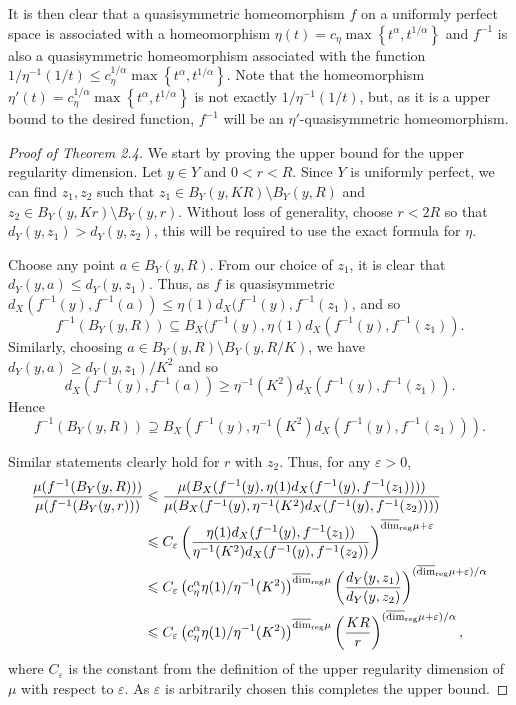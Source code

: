It is then clear that a quasisymmetric homeomorphism $f$ on a uniformly perfect space is associated with a homeomorphism $\eta(t) = c_\eta\max\left\{t^\alpha, t^{1/\alpha}\right\}$ and $f^{-1}$ is also a quasisymmetric homeomorphism associated with the function $1/\eta^{-1}(1/t) \le c_\eta^{1/\alpha} \max\left\{t^\alpha, t^{1/\alpha} \right\}$. Note that the homeomorphism $\eta'(t) = c_\eta^{1/\alpha} \max\left\{t^\alpha, t^{1/\alpha} \right\}$ is not exactly $1/\eta^{-1}(1/t)$, but, as it is a upper bound to the desired function, $f^{-1}$ will be an $\eta'$-quasisymmetric homeomorphism.


\begin{proof}[Proof of Theorem 2.4]
	We start by proving the upper bound for the upper regularity dimension. Let $y\in Y$ and $0<r<R$. Since $Y$ is uniformly perfect, we can find $z_1,z_2$ such that $z_1\in B_Y(y,KR) \setminus B_Y(y,R)$ and $z_2 \in B_Y(y,Kr) \setminus B_Y(y,r)$. Without loss of generality, choose $ r < 2R $ so that $d_Y(y,z_1) > d_Y(y,z_2)$,  this will be required to use the exact formula for $\eta$.
	
	
	Choose any point $a \in B_Y(y,R)$. From our choice of $z_1$, it is clear that $d_Y( y , a ) \le d_Y(y , z_1)$. Thus, as $f$ is quasisymmetric $d_X( f^{-1}(y) , f^{-1}(a) ) \le \eta(1)  d_X(f^{-1}(y) , f^{-1}(z_1) $, and so 
	\[
	f^{-1}(B_Y(y,R)) \subseteq B_X(f^{-1}(y),\eta(1)d_X(f^{-1}(y), f^{-1}(z_1)).
	\]
	Similarly, choosing $a \in B_Y(y,R) \setminus B_Y(y,R/K)$, we have $d_Y( y , a ) \ge d_Y( y , z_1 )/K^2$ and so $$d_X( f^{-1}(y) , f^{-1}(a) ) \ge \eta^{-1}(K^2) d_X( f^{-1}(y) , f^{-1}(z_1) ).$$
	Hence 
	\[
	f^{-1}(B_Y(y,R)) \supseteq B_X(f^{-1}(y),\eta^{-1}(K^2)d_X(f^{-1}(y),f^{-1}(z_1))).
	\]
	
	
	
	Similar statements clearly hold for $r$ with $z_2$. Thus, for any $\varepsilon > 0$,
	\begin{align*}
	\frac{\mu(f^{-1}(B_Y(y,R)))}{\mu(f^{-1}(B_Y(y,r)))} &\leqslant \frac{\mu(B_X(f^{-1}(y),\eta(1)d_X(f^{-1}(y), f^{-1}(z_1)) ))}{\mu(B_X(f^{-1}(y),\eta^{-1}(K^2)d_X(f^{-1}(y),f^{-1}(z_2)) ))} \\
	& \leqslant C_{\varepsilon}\left( \frac{\eta(1)d_X(f^{-1}(y),f^{-1}(z_1))}{\eta^{-1}(K^2)d_X(f^{-1}(y),f^{-1}(z_2))}\right)^{\overline{\dim}_{\textup{reg}} \mu + \varepsilon} \\
	& \leqslant C_{\varepsilon}\left(c_\eta^{\alpha} \eta(1)/\eta^{-1}(K^2)\right)^{\overline{\dim}_{\textup{reg}} \mu} \left(\frac{d_Y(y,z_1)}{d_Y(y,z_2)} \right)^{(\overline{\dim}_{\textup{reg}} \mu + \varepsilon)  / \alpha} \\
	& \leqslant C_{\varepsilon}\left(c_\eta^{\alpha} \eta(1)/\eta^{-1}(K^2)\right)^{\overline{\dim}_{\textup{reg}} \mu} \left(\frac{KR}{r} \right)^{(\overline{\dim}_{\textup{reg}} \mu +\varepsilon)/ \alpha},
	\end{align*}
	where $C_{\varepsilon}$ is the constant from the definition of the upper regularity dimension of $\mu$ with respect to $\varepsilon$. As $\varepsilon$ is arbitrarily chosen this completes the upper bound.
	

\end{proof}
